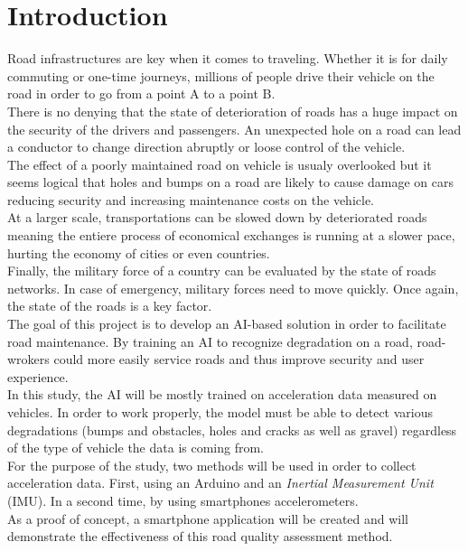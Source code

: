 \section{Introduction}
Road infrastructures are key when it comes to traveling. Whether it is for daily commuting or one-time journeys, millions of people drive their vehicle on the road in order to go from a point A to a point B.\\
There is no denying that the state of deterioration of roads has a huge impact on the security of the drivers and passengers. An unexpected hole on a road can lead a conductor to change direction abruptly or loose control of the vehicle.\\
The effect of a poorly maintained road on vehicle is usualy overlooked but it seems logical that holes and bumps on a road are likely to cause damage on cars reducing security and increasing maintenance costs on the vehicle.\\
At a larger scale, transportations can be slowed down by deteriorated roads meaning the entiere process of economical exchanges is running at a slower pace, hurting the economy of cities or even countries.\\
Finally, the military force of a country can be evaluated by the state of roads networks. In case of emergency, military forces need to move quickly. Once again, the state of the roads is a key factor.\\

The goal of this project is to develop an AI-based solution in order to facilitate road maintenance. By training an AI to recognize degradation on a road, road-wrokers could more easily service roads and thus improve security and user experience.\\
In this study, the AI will be mostly trained on acceleration data measured on vehicles. In order to work properly, the model must be able to detect various degradations (bumps and obstacles, holes and cracks as well as gravel) regardless of the type of vehicle the data is coming from.\\
For the purpose of the study, two methods will be used in order to collect acceleration data. First, using an Arduino and an \textit{Inertial Measurement Unit} (IMU). In a second time, by using smartphones accelerometers.
\\
As a proof of concept, a smartphone application will be created and will demonstrate the effectiveness of this road quality assessment method.\\